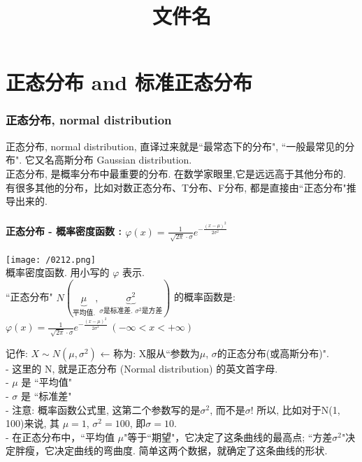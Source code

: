 \documentclass[UTF8]{ctexart}
\title{文件名}
\begin{document}
	\tableofcontents %
	\date{} %
	\maketitle  %

	\part{正态分布 and 标准正态分布}
	
	\section{正态分布, normal distribution}
	
	正态分布, normal distribution, 直译过来就是``最常态下的分布", ``一般最常见的分布". 它又名高斯分布 Gaussian distribution.  \\
	正态分布, 是概率分布中最重要的分布. 在数学家眼里,它是远远高于其他分布的. 有很多其他的分布，比如对数正态分布、T分布、F分布, 都是直接由``正态分布"推导出来的. \\
	
	
	
	
	
	
	
	
	
	
	

\subsection{正态分布 - 概率密度函数 : $\boxed{
	\varphi (x)=\frac{1}{\sqrt[]{2\pi}\cdot \sigma}e^{-\frac{(x-\mu )^2}{2\sigma ^2}}
}$ }

\texttt{[image: /0212.png]} \\

	
	概率密度函数. 用小写的 $\varphi$ 表示. \\
	``正态分布" $N(\underset{\text{平均值}.}{\underbrace{\mu }},\underset{\sigma \text{是标准差.\ }\sigma ^2\text{是方差}}{\underbrace{\sigma ^2}})	$ 的概率函数是: 
	 $\boxed{
		\varphi (x)=\frac{1}{\sqrt[]{2\pi}\cdot \sigma}e^{-\frac{(x-\mu )^2}{2\sigma ^2}} \ (-\infty <x<+\infty )
	}$  \\
\vspace{1em} 

	记作: $\boxed{X \sim N(\mu ,\sigma ^2)}$   ← 称为: X服从``参数为$\mu$, $\sigma$的正态分布(或高斯分布)". \\	
	- 这里的 N, 就是正态分布 (Normal distribution) 的英文首字母.\\
	- $\mu$ 是 ``平均值" \\
	- $\sigma$ 是 ``标准差" \\
	- 注意: 概率函数公式里, 这第二个参数写的是$\sigma ^2$, 而不是$\sigma$! 所以, 比如对于N(1, 100)来说, 其 $\mu=1$,  $\sigma ^2=100$, 即$\sigma=10$. \\
	- 在正态分布中，``平均值 $\mu$"等于``期望"，它决定了这条曲线的最高点; ``方差$\sigma^2$"决定胖瘦，它决定曲线的弯曲度. 简单这两个数据，就确定了这条曲线的形状. \\
	
\end{document}
